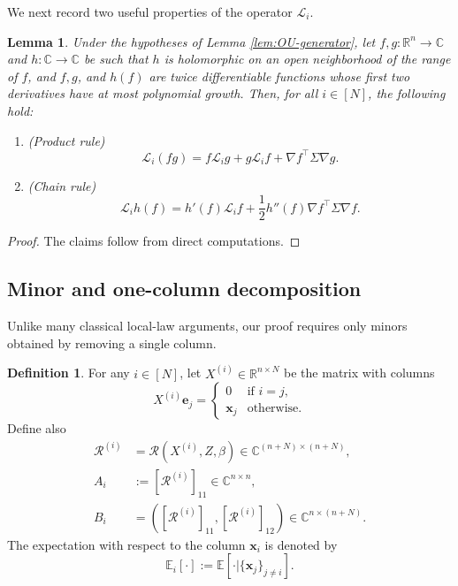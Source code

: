 \documentclass[11pt,reqno]{amsart}
\def\R{\mathbb{R}}
\def\e{\mathbf{e}}
\def\x{\mathbf{x}}
\def\C{\mathbb{C}}
\def\E{\mathbb{E}}
\def\cL{\mathcal{L}}
\def\cR{\mathcal{R}}
\newtheorem{lemma}[theorem]{Lemma}
\theoremstyle{definition}
\newtheorem{defi}[theorem]{Definition}
\numberwithin{equation}{section}
\numberwithin{figure}{section}
\begin{document}
We next record two useful properties of the operator $\cL_i$.
\begin{lemma}\label{lem:product-and-chain-rule}
Under the hypotheses of Lemma \ref{lem:OU-generator}, let $f,g:\R^{n}\rightarrow\C$ and $h:\C\rightarrow\C$ be such that $h$ is holomorphic on an open neighborhood of the range of $f$, and $f,g$, and $h(f)$ are twice differentiable functions whose first two derivatives have at most polynomial growth. Then, for all $i\in[N]$, the following hold:
\begin{enumerate}
    \item (Product rule)
    \[
        \cL_i(fg)=f\cL_ig+g\cL_if+\nabla f^\top\Sigma\nabla g.
    \]
    \item (Chain rule)
    \[
        \cL_ih(f)=h'(f)\cL_if+\frac{1}{2}h''(f)\nabla f^\top\Sigma\nabla f.
    \]
\end{enumerate}
\end{lemma}
\begin{proof}
The claims follow from direct computations.
\end{proof}

\subsection{Minor and one-column decomposition}
Unlike many classical local-law arguments, our proof requires only minors obtained by removing a single column.
\begin{defi}
For any $i\in[N]$, let $X^{(i)}\in\R^{n\times N}$ be the matrix with columns
\[
    X^{(i)}\e_j=\begin{cases}
        0 & \text{if $i=j$,}\\
        \x_j & \text{otherwise.}
    \end{cases}
\]
Define also
\begin{align*}
    \cR^{(i)}&=\cR(X^{(i)},Z,\beta)\in\C^{(n+N)\times(n+N)},\\
    A_i&:=[\cR^{(i)}]_{11}\in\C^{n\times n},\\
    B_i&=([\cR^{(i)}]_{11},[\cR^{(i)}]_{12})\in\C^{n\times (n+N)}.
\end{align*}
The expectation with respect to the column $\x_i$ is denoted by
\[
    \E_i[\cdot]:=\E[\cdot|\{\x_j\}_{j\neq i}].
\]
\end{defi}
\end{document}
